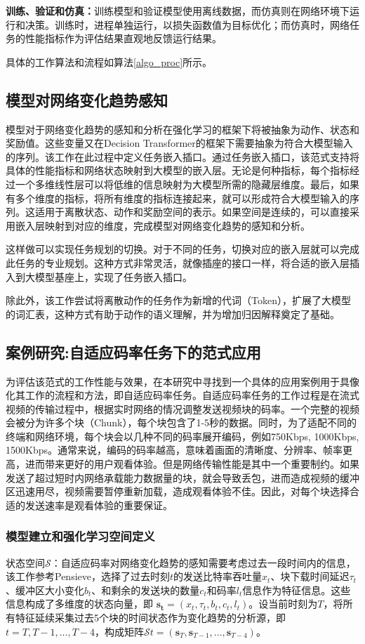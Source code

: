 \textbf{训练、验证和仿真：}训练模型和验证模型使用离线数据，而仿真则在网络环境下运行和决策。训练时，进程单独运行，以损失函数值为目标优化；而仿真时，网络任务的性能指标作为评估结果直观地反馈运行结果。

具体的工作算法和流程如算法\ref{algo_proc}所示。


\subsection{模型对网络变化趋势感知}
模型对于网络变化趋势的感知和分析在强化学习的框架下将被抽象为动作、状态和奖励值。这些变量又在Decision Transformer的框架下需要抽象为符合大模型输入的序列。该工作在此过程中定义任务嵌入插口。通过任务嵌入插口，该范式支持将具体的性能指标和网络状态映射到大模型的嵌入层。无论是何种指标，每个指标经过一个多维线性层可以将低维的信息映射为大模型所需的隐藏层维度。最后，如果有多个维度的指标，将所有维度的指标连接起来，就可以形成符合大模型输入的序列。这适用于离散状态、动作和奖励空间的表示。如果空间是连续的，可以直接采用嵌入层映射到对应的维度，完成模型对网络变化趋势的感知和分析。

这样做可以实现任务规划的切换。对于不同的任务，切换对应的嵌入层就可以完成此任务的专业规划。这种方式非常灵活，就像插座的接口一样，将合适的嵌入层插入到大模型基座上，实现了任务嵌入插口。

除此外，该工作尝试将离散动作的任务作为新增的代词（Token），扩展了大模型的词汇表，这种方式有助于动作的语义理解，并为增加归因解释奠定了基础。

\subsection{案例研究:自适应码率任务下的范式应用}
为评估该范式的工作性能与效果，在本研究中寻找到一个具体的应用案例用于具像化其工作的流程和方法，即自适应码率任务。自适应码率任务的工作过程是在流式视频的传输过程中，根据实时网络的情况调整发送视频块的码率。一个完整的视频会被分为许多个块（Chunk），每个块包含了1-5秒的数据。同时，为了适配不同的终端和网络环境，每个块会以几种不同的码率展开编码，例如750Kbps, 1000Kbps, 1500Kbps。通常来说，编码的码率越高，意味着画面的清晰度、分辨率、帧率更高，进而带来更好的用户观看体验。但是网络传输性能是其中一个重要制约。如果发送了超过短时内网络承载能力数据量的块，就会导致丢包，进而造成视频的缓冲区迅速用尽，视频需要暂停重新加载，造成观看体验不佳。因此，对每个块选择合适的发送速率是观看体验的重要保证。

\subsubsection{模型建立和强化学习空间定义}
状态空间$\mathcal{S}$：自适应码率对网络变化趋势的感知需要考虑过去一段时间内的信息，该工作参考Pensieve\cite{mao2017neural}，选择了过去时刻$t$的发送比特率吞吐量$x_t$、块下载时间延迟$\tau_t$、缓冲区大小变化$b_t$、和剩余的发送块的数量$c_t$和码率$l_t$信息作为特征信息。这些信息构成了多维度的状态向量，即 $\boldsymbol{s_t} = (x_t, \tau_t, b_t, c_t, l_t)$。设当前时刻为$T$，将所有特征延续采集过去5个块的时间状态作为变化趋势的分析源，即$t = T, T-1, ..., T-4$，构成矩阵$\mathcal{S}t = (\boldsymbol{s}_T, \boldsymbol{s}_{T-1}, ..., \boldsymbol{s}_{T-4})$。


